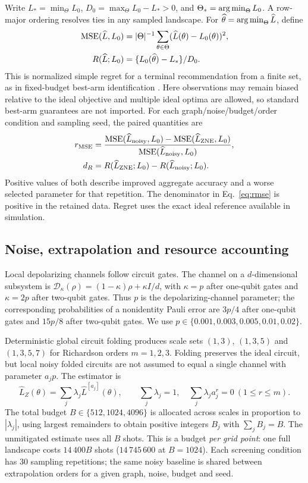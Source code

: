 Write $L_*=\min_\Theta L_0$, $D_0=\max_\Theta L_0-L_*>0$, and $\Theta_*=\operatorname*{arg\,min}_\Theta L_0$. A row-major ordering resolves ties in any sampled landscape. For $\widehat\theta=\operatorname*{arg\,min}_\Theta\widehat L$, define
\begin{align}
 \operatorname{MSE}(\widehat L,L_0)&=|\Theta|^{-1}\sum_{\theta\in\Theta}(\widehat L(\theta)-L_0(\theta))^2,\\
 R(\widehat L;L_0)&=\{L_0(\widehat\theta)-L_*\}/D_0.
\end{align}
This is normalized simple regret for a terminal recommendation from a finite set, as in fixed-budget best-arm identification \citep{AudibertBubeckMunos2010BestArm}. Here observations may remain biased relative to the ideal objective and multiple ideal optima are allowed, so standard best-arm guarantees are not imported. For each graph/noise/budget/order condition and sampling seed, the paired quantities are
\begin{align}
 r_{\operatorname{MSE}}&=\frac{\operatorname{MSE}(\widehat L_{\mathrm{noisy}},L_0)-\operatorname{MSE}(\widehat L_{\mathrm{ZNE}},L_0)}{\operatorname{MSE}(\widehat L_{\mathrm{noisy}},L_0)},\label{eq:rmse}\\
 d_R&=R(\widehat L_{\mathrm{ZNE}};L_0)-R(\widehat L_{\mathrm{noisy}};L_0).\label{eq:dr}
\end{align}
Positive values of both describe improved aggregate accuracy and a worse selected parameter for that repetition. The denominator in Eq.~\eqref{eq:rmse} is positive in the retained data. Regret uses the exact ideal reference available in simulation.

\subsection{Noise, extrapolation and resource accounting}
Local depolarizing channels follow circuit gates. The channel on a $d$-dimensional subsystem is $\mathcal D_\kappa(\rho)=(1-\kappa)\rho+\kappa I/d$, with $\kappa=p$ after one-qubit gates and $\kappa=2p$ after two-qubit gates. Thus $p$ is the depolarizing-channel parameter; the corresponding probabilities of a nonidentity Pauli error are $3p/4$ after one-qubit gates and $15p/8$ after two-qubit gates. We use $p\in\{0.001,0.003,0.005,0.01,0.02\}$.

Deterministic global circuit folding \citep{GiurgicaTiron2020DigitalZNE} produces scale sets $(1,3)$, $(1,3,5)$ and $(1,3,5,7)$ for Richardson orders $m=1,2,3$. Folding preserves the ideal circuit, but local noisy folded circuits are not assumed to equal a single channel with parameter $a_jp$. The estimator is
\begin{equation}
 \widehat L_Z(\theta)=\sum_j\lambda_j\widehat L^{[a_j]}(\theta),\qquad
 \sum_j\lambda_j=1,\quad\sum_j\lambda_j a_j^r=0\ (1\le r\le m).
\end{equation}
The total budget $B\in\{512,1024,4096\}$ is allocated across scales in proportion to $|\lambda_j|$, using largest remainders to obtain positive integers $B_j$ with $\sum_j B_j=B$. The unmitigated estimate uses all $B$ shots. This is a budget \emph{per grid point}: one full landscape costs $14\,400B$ shots ($14\,745\,600$ at $B=1024$). Each screening condition has 30 sampling repetitions; the same noisy baseline is shared between extrapolation orders for a given graph, noise, budget and seed.

